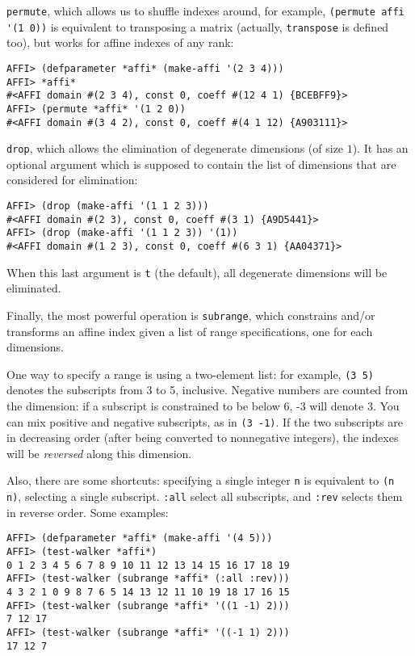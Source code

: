 \documentclass[letterpaper,11pt]{article}
\begin{document}
\lstinline!permute!, which allows us to shuffle indexes around, for
example, \lstinline!(permute affi '(1 0))! is equivalent to
transposing a matrix (actually, \lstinline!transpose! is defined too),
but works for affine indexes of any rank:
\begin{lstlisting}
AFFI> (defparameter *affi* (make-affi '(2 3 4)))
AFFI> *affi*
#<AFFI domain #(2 3 4), const 0, coeff #(12 4 1) {BCEBFF9}>
AFFI> (permute *affi* '(1 2 0))
#<AFFI domain #(3 4 2), const 0, coeff #(4 1 12) {A903111}>
\end{lstlisting}

\lstinline!drop!, which allows the elimination of degenerate
dimensions (of size $1$).  It has an optional argument which is
supposed to contain the list of dimensions that are considered for
elimination:
\begin{lstlisting}
AFFI> (drop (make-affi '(1 1 2 3)))
#<AFFI domain #(2 3), const 0, coeff #(3 1) {A9D5441}>
AFFI> (drop (make-affi '(1 1 2 3)) '(1))
#<AFFI domain #(1 2 3), const 0, coeff #(6 3 1) {AA04371}>
\end{lstlisting}
When this last argument is \lstinline!t! (the default), all degenerate
dimensions will be eliminated.

Finally, the most powerful operation is \lstinline!subrange!, which
constrains and/or transforms an affine index given a list of range
specifications, one for each dimensions.

One way to specify a range is using a two-element list: for example,
\lstinline!(3 5)! denotes the subscripts from 3 to 5, inclusive.
Negative numbers are counted from the dimension: if a subscript is
constrained to be below 6, -3 will denote 3.  You can mix positive and
negative subscripts, as in \lstinline!(3 -1)!.  If the two subscripts
are in decreasing order (after being converted to nonnegative
integers), the indexes will be \emph{reversed} along this dimension.

Also, there are some shortcuts: specifying a single integer
\lstinline!n! is equivalent to \lstinline!(n n)!, selecting a single
subscript.  \lstinline!:all! select all subscripts, and \lstinline!:rev!
selects them in reverse order.  Some examples:
\begin{lstlisting}
AFFI> (defparameter *affi* (make-affi '(4 5)))
AFFI> (test-walker *affi*)
0 1 2 3 4 5 6 7 8 9 10 11 12 13 14 15 16 17 18 19 
AFFI> (test-walker (subrange *affi* (:all :rev)))
4 3 2 1 0 9 8 7 6 5 14 13 12 11 10 19 18 17 16 15 
AFFI> (test-walker (subrange *affi* '((1 -1) 2)))
7 12 17 
AFFI> (test-walker (subrange *affi* '((-1 1) 2)))
17 12 7 
\end{lstlisting}
\end{document}
